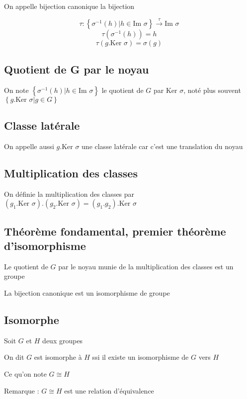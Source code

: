 \documentclass[a4paper,10pt]{article}
\newcommand{\Ker}{\mbox{Ker }}
\newcommand{\im}{\mbox{Im }}
\newcommand{\apw}[1]{\stackrel{#1}{\rightarrow}}
\newcommand{\tset}[1]{\left\lbrace #1 \right\rbrace}
\begin{document}
On appelle bijection canonique la bijection 

$$\tau : \tset{\sigma^{-1}(h)\vert h \in \im \sigma} \apw{\tau} \im \sigma$$
$$\tau(\sigma^{-1}(h))=h$$
$$\tau(g.\Ker \sigma)=\sigma(g)$$

\subsection{Quotient de G par le noyau}

On note $\tset{\sigma^{-1} (h) \vert h \in \im \sigma}$ le quotient de $G$ par $\Ker \sigma$, noté plus souvent $\tset{g . \Ker \sigma \vert g \in G}$

\subsection{Classe latérale}

On appelle aussi $g.\Ker \sigma$ une classe latérale car c'est une translation du noyau

\subsection{Multiplication des classes}

On définie la multiplication des classes par $(g_1 . \Ker \sigma) . (g_2.\Ker \sigma) = (g_1.g_2) . \Ker \sigma$

\subsection{Théorème fondamental, premier théorème d'isomorphisme}

Le quotient de $G$ par le noyau munie de la multiplication des classes est un groupe

La bijection canonique est un isomorphisme de groupe

\subsection{Isomorphe}

Soit $G$ et $H$ deux groupes

On dit $G$ est isomorphe à $H$ ssi il existe un isomorphisme de $G$ vers $H$

Ce qu'on note $G \cong H$

Remarque : $G \cong H$ est une relation d'équivalence
\end{document}
